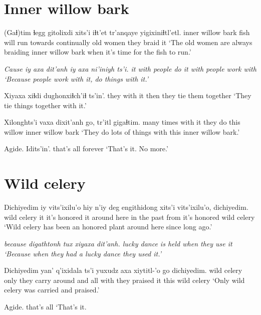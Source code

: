 \documentclass[12pt]{article}
\begin{document}
\section{Inner willow bark}

\gll (Gaɬ)tim ɬegg gitolixdi xits'i iɬt'et tr'anqaye  yigixiniɬtl'etl.
{inner willow bark} fish {will run} towards continually {old women} {they braid it}
\glt `The old women are always braiding inner willow bark when it's time for the fish to run.'
\glend

\gll \em{Cause} iy axa dit'anh iy axa ni'iniyh ts'i.
{} it with {people do} it with {people work with}
\glt `Because people work with it, do things with it.'
\glend

\gll Xiyaxa xiɬdi dughonxiɬch'iɬ ts'in'.
{they with it} then {they tie them together} {}
\glt `They tie things together with it.'
\glend

\gll Xilonghts'i vaxa dixit'anh go, tr'itl gigaɬtim.
{many times} {with it} {they do} this willow {inner willow bark}
\glt `They do lots of things with this inner willow bark.'
\glend

\gll Agide. Idits'in'.
{that's all} {forever}
\glt `That's it. No more.'
\glend

\section{Wild celery}

\gll Dichiyedim iy vits'ixilu'o hiy n'iy deg engithidong xits'i vits'ixilu'o, dichiyedim.
{wild celery} it {it's honored} it {} {around here} {in the past} from {it's honored} {wild celery}
\glt `Wild celery has been an honored plant around here since long ago.'
\glend

\gll \em because \em digathtonh tux {xiyaxa dit'anh}.
{}        {lucky dance is held} when {they use it}
\glt `Because when they had a lucky dance they used it.'
\glend

\gll Dichiyedim yan' q'ixidala ts'i yuxudz axa xiytitl-'o go dichiyedim.
{wild celery} only {they carry around} and all with {they praised it} this {wild celery}
\glt `Only wild celery was carried and praised.'
\glend

\gll Agide. 
{{that's all}}
\glt `That's it. 
\glend
\end{document}
